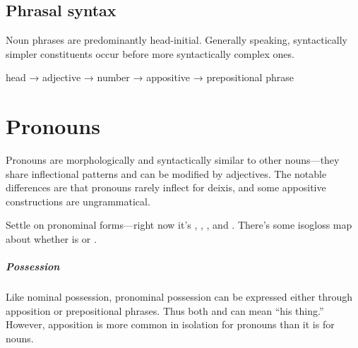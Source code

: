 \section{Phrasal syntax}
Noun phrases are predominantly head-initial. Generally speaking, syntactically simpler constituents occur before more syntactically complex ones.

\begin{example}
    head → adjective → number → appositive → prepositional phrase
\end{example}

\setchapterpreamble[u]{\margintoc}
\chapter{Pronouns}
Pronouns are morphologically and syntactically similar to other nouns---they share inflectional patterns and can be modified by adjectives. The notable differences are that pronouns rarely inflect for deixis, and some appositive constructions are ungrammatical.

\begin{kaobox}[frametitle=\sc todo:]
Settle on pronominal forms---right now it's  ,  ,  , and  . There's some isogloss map about whether  is  or .
\end{kaobox}

\paragraph{Possession}
Like nominal possession, pronominal possession can be expressed either through apposition or prepositional phrases.  Thus both  and  can mean “his thing.” However, apposition is more common in isolation for pronouns than it is for nouns.